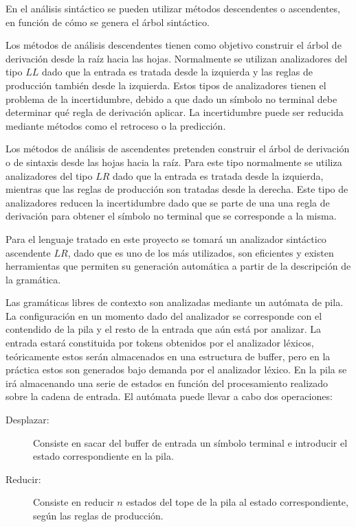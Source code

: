 En el análisis sintáctico se pueden utilizar métodos descendentes o ascendentes, en función de cómo se genera el árbol sintáctico. 

Los métodos de análisis descendentes tienen como objetivo construir el árbol de derivación desde la raíz hacia las hojas. Normalmente se
utilizan analizadores del tipo $LL$ dado que la entrada es tratada desde la izquierda y las reglas de producción también desde la izquierda.
Estos tipos de analizadores tienen el problema de la incertidumbre, debido a que dado un símbolo no terminal debe determinar qué regla de derivación aplicar. 
La incertidumbre puede ser reducida mediante métodos como el retroceso o la predicción.
 
Los métodos de análisis de ascendentes pretenden construir el árbol de derivación o de sintaxis desde las hojas hacia la raíz. Para este tipo normalmente se utiliza 
analizadores del tipo $LR$ dado que la entrada es tratada desde la izquierda, mientras que las reglas de producción son tratadas desde la derecha. Este tipo de
analizadores reducen la incertidumbre dado que se parte de una una regla de derivación para obtener el símbolo no terminal que se corresponde a la misma. 

Para el lenguaje tratado en este proyecto se tomará un analizador sintáctico ascendente $LR$, dado que es uno de los más utilizados, son eficientes y 
existen herramientas que permiten su generación automática a partir de la descripción de la gramática. 

Las gramáticas libres de contexto son analizadas mediante un autómata de pila. La configuración en un momento dado del analizador se corresponde con el contendido de la pila y el resto de la 
entrada que aún está por analizar. La entrada estará constituida por tokens obtenidos por el analizador léxicos, teóricamente estos serán almacenados en una estructura de buffer, pero 
en la práctica estos son generados bajo demanda por el analizador léxico. En la pila se irá almacenando una serie de estados en función del procesamiento realizado sobre la cadena de entrada. 
El autómata puede llevar a cabo dos operaciones:

\begin{description}
\item[Desplazar:] Consiste en sacar del buffer de entrada un símbolo terminal e introducir el estado correspondiente en la pila.
\item[Reducir:] Consiste en reducir $n$ estados del tope de la pila al estado correspondiente, según las reglas de producción.
\end{description}

